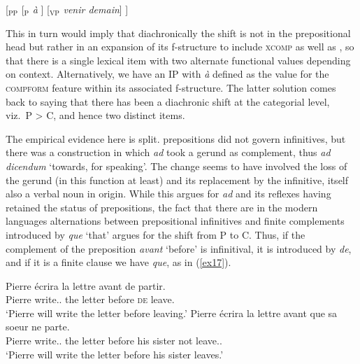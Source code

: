 \documentclass[output=paper]{langsci/langscibook}
\begin{document}

\begin{exe}
\ex\label{ex16} [$_{\textrm {PP}}$ [$_{\textrm{P}}$ \emph{\`a} ] [$_{\textrm{VP}}$ \emph{venir demain}] ]
\end{exe}

This in turn would imply that diachronically the shift is not in the
prepositional head but rather in an expansion of its f-structure to include
\textsc{xcomp} as well as \Obl{}, so that there is a single lexical item with
two alternate functional values depending on context. Alternatively, we have an
IP with \emph{\`a} defined as the value for the \textsc{compform} feature
within its associated f-structure. The latter solution comes back to saying
that there has been a diachronic shift at the categorial level, viz.\ P > C,
and hence two distinct items.

The empirical evidence here is split.  prepositions did not govern
infinitives, but there was a construction in which \emph{ad} took a gerund as
complement, thus \emph{ad dicendum} `towards, for speaking'. The change seems
to have involved the loss of the gerund (in this function at least) and its
replacement by the infinitive, itself also a verbal noun in origin. While this
argues for \emph{ad} and its  reflexes having retained the status of
prepositions, the fact that there are in the modern languages alternations
between prepositional infinitives and finite complements introduced by
\emph{que} `that' argues for the shift from P to C. Thus, if the complement of
the preposition \emph{avant} `before' is infinitival, it is introduced by
\emph{de}, and if it is a finite clause we have \emph{que}, as in
(\ref{ex17}).

\begin{exe}
\ex\label{ex17} 
\begin{xlist}
\ex\label{ex17a}
\gll Pierre \'ecrira  la lettre avant de partir.\\
Pierre write.\Fut.\Tsg{} the letter before \textsc{de} leave.\Inf{}\\
\trans \enquote*{Pierre will write the letter before leaving.}
\ex\label{ex17b}
\gll Pierre \'ecrira la 	lettre avant que sa soeur ne parte.\\
Pierre write.\Fut.\Tsg{} the letter before \Comp{} his sister not leave.\Sbjv.\Sg{}\\
\trans \enquote*{Pierre will write the letter before his sister leaves.}
\end{xlist}
\end{exe}
\end{document}
